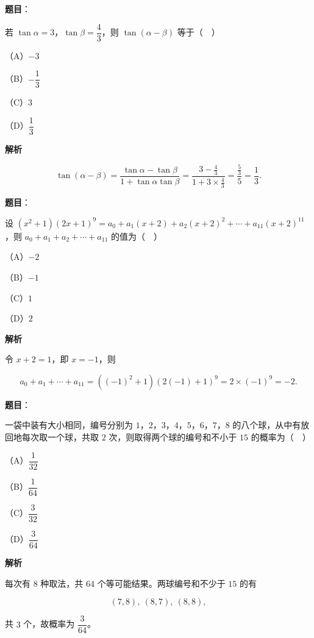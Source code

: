 \begin{answer}

\textbf{题目}：

若 $\tan\alpha=3$，$\tan\beta=\dfrac43$，则 $\tan(\alpha-\beta)$ 等于（　）

（A）$-3$

（B）$-\dfrac13$

（C）$3$

（D）$\dfrac13$

\textbf{解析}

\nopagebreak[4]
\[\tan(\alpha-\beta)=\frac{\tan\alpha-\tan\beta}{1+\tan\alpha\tan\beta}=\frac{3-\frac43}{1+3\times\frac43}=\frac{\frac53}{5}=\frac13.\]


\end{answer}
\begin{answer}

\textbf{题目}：

设 $(x^2+1)(2x+1)^9=a_0+a_1(x+2)+a_2(x+2)^2+\cdots+a_{11}(x+2)^{11}$，则 $a_0+a_1+a_2+\cdots+a_{11}$ 的值为（　）

（A）$-2$

（B）$-1$

（C）$1$

（D）$2$

\textbf{解析}

令 $x+2=1$，即 $x=-1$，则

\nopagebreak[4]
\[a_0+a_1+\cdots+a_{11}=((-1)^2+1)(2(-1)+1)^9=2\times(-1)^9=-2.\]


\end{answer}
\begin{answer}

\textbf{题目}：

一袋中装有大小相同，编号分别为 $1$，$2$，$3$，$4$，$5$，$6$，$7$，$8$ 的八个球，从中有放回地每次取一个球，共取 $2$ 次，则取得两个球的编号和不小于 $15$ 的概率为（　）

（A）$\dfrac1{32}$

（B）$\dfrac1{64}$

（C）$\dfrac3{32}$

（D）$\dfrac3{64}$

\textbf{解析}

每次有 $8$ 种取法，共 $64$ 个等可能结果。两球编号和不少于 $15$ 的有

\nopagebreak[4]
\[(7,8),\ (8,7),\ (8,8),\]

共 $3$ 个，故概率为 $\dfrac3{64}$。


\end{answer}
